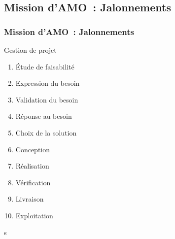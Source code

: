 \subsection{Mission d'AMO~: Jalonnements}
\begin{frame}
	\frametitle{Mission d'AMO~: Jalonnements}
\end{frame}

\begin{frame}
	\centering
	\begin{block}{Gestion de projet}
	\begin{enumerate}
		\item Étude de faisabilité\pause
		\item Expression du besoin\pause
		\item Validation du besoin\pause
		\item Réponse au besoin\pause
		\item Choix de la solution\pause
		\item Conception\pause
		\item Réalisation\pause
		\item Vérification\pause
		\item Livraison\pause
		\item Exploitation\pause
	\end{enumerate}
	\end{block}
\end{frame}
s